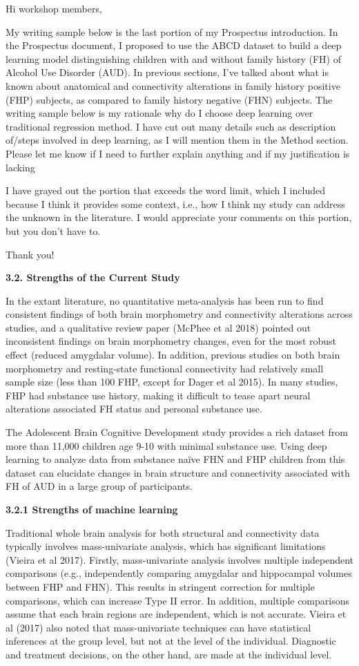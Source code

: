 \documentclass[]{article}
\date{}
\begin{document}
Hi workshop members,

My writing sample below is the last portion of my Prospectus
introduction. In the Prospectus document, I proposed to use the ABCD
dataset to build a deep learning model distinguishing children with and
without family history (FH) of Alcohol Use Disorder (AUD). In previous
sections, I've talked about what is known about anatomical and
connectivity alterations in family history positive (FHP) subjects, as
compared to family history negative (FHN) subjects. The writing sample
below is my rationale why do I choose deep learning over traditional
regression method. I have cut out many details such as description
of/steps involved in deep learning, as I will mention them in the Method
section. Please let me know if I need to further explain anything and if
my justification is lacking

I have grayed out the portion that exceeds the word limit, which I
included because I think it provides some context, i.e., how I think my
study can address the unknown in the literature. I would appreciate your
comments on this portion, but you don't have to.

Thank you!

\textbf{3.2. Strengths of the Current Study}

In the extant literature, no quantitative meta-analysis has been run to
find consistent findings of both brain morphometry and connectivity
alterations across studies, and a qualitative review paper (McPhee et al
2018) pointed out inconsistent findings on brain morphometry changes,
even for the most robust effect (reduced amygdalar volume). In addition,
previous studies on both brain morphometry and resting-state functional
connectivity had relatively small sample size (less than 100 FHP, except
for Dager et al 2015). In many studies, FHP had substance use history,
making it difficult to tease apart neural alterations associated FH
status and personal substance use.

The Adolescent Brain Cognitive Development study provides a rich dataset
from more than 11,000 children age 9-10 with minimal substance use.
Using deep learning to analyze data from substance naïve FHN and FHP
children from this dataset can elucidate changes in brain structure and
connectivity associated with FH of AUD in a large group of participants.

\textbf{3.2.1 Strengths of machine learning}

Traditional whole brain analysis for both structural and connectivity
data typically involves mass-univariate analysis, which has significant
limitations (Vieira et al 2017). Firstly, mass-univariate analysis
involves multiple independent comparisons (e.g., independently comparing
amygdalar and hippocampal volumes between FHP and FHN). This results in
stringent correction for multiple comparisons, which can increase Type
II error. In addition, multiple comparisons assume that each brain
regions are independent, which is not accurate. Vieira et al (2017) also
noted that mass-univariate techniques can have statistical inferences at
the group level, but not at the level of the individual. Diagnostic and
treatment decisions, on the other hand, are made at the individual
level.
\end{document}
